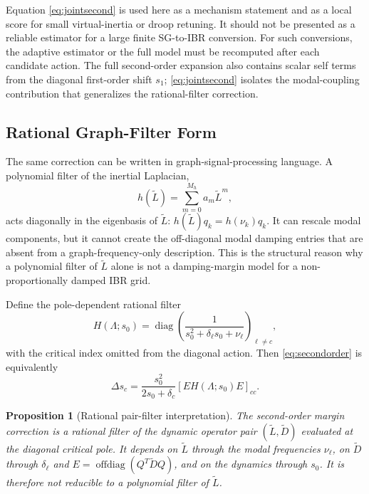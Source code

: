 \documentclass[journal]{IEEEtran}
\newtheorem{proposition}{Proposition}
\newcommand{\Lt}{\widetilde L}
\newcommand{\Dt}{\widetilde D}
\newcommand{\diag}{\operatorname{diag}}
\begin{document}
Equation \eqref{eq:jointsecond} is used here as a mechanism statement and as a local score for small virtual-inertia or droop retuning. It should not be presented as a reliable estimator for a large finite SG-to-IBR conversion. For such conversions, the adaptive estimator or the full model must be recomputed after each candidate action. The full second-order expansion also contains scalar self terms from the diagonal first-order shift $s_1$; \eqref{eq:jointsecond} isolates the modal-coupling contribution that generalizes the rational-filter correction.

\subsection{Rational Graph-Filter Form}

The same correction can be written in graph-signal-processing language. A polynomial filter of the inertial Laplacian,
\begin{equation}
h(\Lt)=\sum_{m=0}^{M_h} a_m \Lt^m,
\end{equation}
acts diagonally in the eigenbasis of $\Lt$: $h(\Lt)q_k=h(\nu_k)q_k$. It can rescale modal components, but it cannot create the off-diagonal modal damping entries that are absent from a graph-frequency-only description. This is the structural reason why a polynomial filter of $\Lt$ alone is not a damping-margin model for a non-proportionally damped IBR grid.

Define the pole-dependent rational filter
\begin{equation}
H(\Lambda;s_0)=\diag\left(\frac{1}{s_0^2+\delta_\ell s_0+\nu_\ell}\right)_{\ell\neq c},
\end{equation}
with the critical index omitted from the diagonal action. Then \eqref{eq:secondorder} is equivalently
\begin{equation}
\Delta s_c=
\frac{s_0^2}{2s_0+\delta_c}
\left[E H(\Lambda;s_0) E\right]_{cc}.
\label{eq:rationalfilter}
\end{equation}

\begin{proposition}[Rational pair-filter interpretation]
The second-order margin correction is a rational filter of the dynamic operator pair $(\Lt,\Dt)$ evaluated at the diagonal critical pole. It depends on $\Lt$ through the modal frequencies $\nu_\ell$, on $\Dt$ through $\delta_\ell$ and $E=\operatorname{offdiag}(Q^T\Dt Q)$, and on the dynamics through $s_0$. It is therefore not reducible to a polynomial filter of $\Lt$.
\end{proposition}
\end{document}
